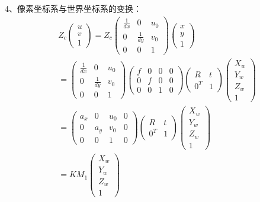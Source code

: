 4、像素坐标系与世界坐标系的变换：
\begin{align}
&Z_c\begin{pmatrix}
u \\ v \\ 1
\end{pmatrix}
=
Z_c\begin{pmatrix}
\frac{1}{dx} & 0 & u_0 \\
0 & \frac{1}{dy} & v_0 \\
0 & 0 & 1
\end{pmatrix}\begin{pmatrix}
x \\ y \\ 1
\end{pmatrix} \\
& =
\begin{pmatrix}
\frac{1}{dx} & 0 & u_0 \\
0 & \frac{1}{dy} & v_0 \\
0 & 0 & 1
\end{pmatrix}\begin{pmatrix}
f & 0 & 0 & 0\\
0 & f & 0 & 0\\
0 & 0 & 1 & 0
\end{pmatrix}
\begin{pmatrix}
R & t \\
0^T & 1
\end{pmatrix}
\begin{pmatrix}
X_w \\ Y_w \\ Z_w \\ 1
\end{pmatrix} \\
& =
\begin{pmatrix}
a_x & 0 & u_0 & 0\\
0 & a_y & v_0 & 0\\
0 & 0 & 1 & 0
\end{pmatrix}\begin{pmatrix}
R & t \\
0^T & 1
\end{pmatrix}
\begin{pmatrix}
X_w \\ Y_w \\ Z_w \\ 1
\end{pmatrix} \\
& =
KM_1\begin{pmatrix}
X_w \\ Y_w \\ Z_w \\ 1

\end{pmatrix}
\end{align}
